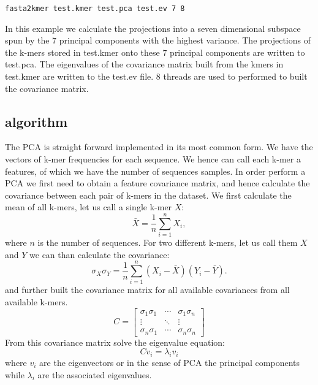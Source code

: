 \begin{lstlisting}
fasta2kmer test.kmer test.pca test.ev 7 8
\end{lstlisting}
In this example we calculate the projections into a seven dimensional
subspace spun by the 7 principal components with the highest
variance. The projections of the k-mers stored in test.kmer onto these
7 principal components are written to test.pca. The eigenvalues of the
covariance matrix built from the kmers in test.kmer are written to the
test.ev file. 8 threads are used to performed to built the covariance
matrix.

\subsection{algorithm}

The PCA is straight forward implemented in its most common form. We
have the vectors of k-mer frequencies for each sequence. We hence can
call each k-mer a features, of which we have the number of sequences
samples. In order perform a PCA we first need to obtain a feature
covariance matrix, and hence calculate the covariance between each pair of
k-mers in the dataset. We first calculate the mean of all
k-mers, let us call a single k-mer $X$:
\begin{equation}
  \bar{X} = \frac{1}{n}\sum_{i=1}^{n}X_i,
\end{equation}
where $n$ is the number of sequences. For two different k-mers, let us
call them $X$ and $Y$ we can than calculate the covariance:
\begin{equation}
  \sigma_X\sigma_Y =
  \frac{1}{n}\sum_{i=1}^{n}(X_i-\bar{X})(Y_i-\bar{Y}). \label{eqn-covariance}
\end{equation}
and further built the covariance matrix for all available covariances
from all available k-mers.
\begin{equation}
  C = \left[
    \begin{array}{ccc}
      \sigma_1\sigma_1 & \cdots & \sigma_1\sigma_n \\
      \vdots & \ddots & \vdots \\
      \sigma_n\sigma_1 & \cdots & \sigma_n\sigma_n
    \end{array}
    \right] \label{eqn-covariance-matrix}
\end{equation}
From this covariance matrix solve the eigenvalue equation:
\begin{equation}
  Cv_i=\lambda_i v_i \label{eqn-eigen}
\end{equation}
where $v_i$ are the eigenvectors or in the sense of PCA the principal
components while $\lambda_i$ are the associated eigenvalues.

